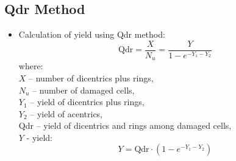 \documentclass[a4paper,11pt]{article}
\begin{document}
\subsection{Qdr Method}
\begin{itemize}
	\item Calculation of yield using Qdr method:
	$$
	\textrm{Qdr} = \frac{X}{N_u} = \frac{Y}{1-e^{-Y_1-Y_2}}
	$$
	where:\\
	$X$ -- number of dicentrics plus rings,\\
	$N_u$ -- number of damaged cells,\\
	$Y_1$ -- yield of dicentrics plus rings,\\
	$Y_2$ -- yield of acentrics,\\
	Qdr -- yield of dicentrics and rings among damaged cells,\\
	$Y$ - yield:
	$$
	Y = \textrm{Qdr} \cdot \left( 1 - e^{-Y_1-Y_2} \right)
	$$
\end{itemize}
\end{document}

